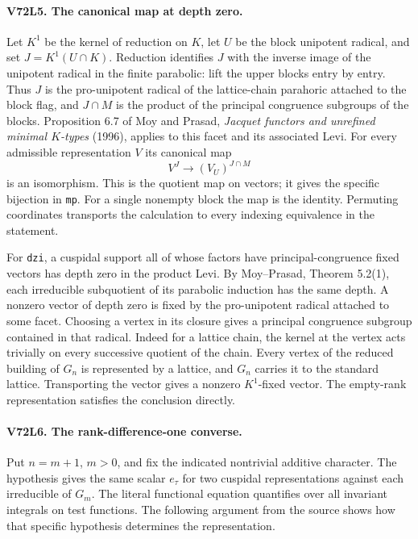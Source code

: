 \paragraph{V72L5. The canonical map at depth zero.}
Let $K^1$ be the kernel of reduction on $K$, let $U$ be the block
unipotent radical, and set $J=K^1(U\cap K)$. Reduction identifies
$J$ with the inverse image of the unipotent radical in the finite
parabolic: lift the upper blocks entry by entry. Thus $J$ is the
pro-unipotent radical of the lattice-chain parahoric attached to
the block flag, and $J\cap M$ is the product of the principal
congruence subgroups of the blocks. Proposition 6.7 of Moy and
Prasad, \emph{Jacquet functors and unrefined minimal $K$-types}
(1996), applies to this facet and its associated Levi. For every
admissible representation $V$ its canonical map
\[
                  V^J\longrightarrow(V_U)^{J\cap M}
\]
is an isomorphism. This is the quotient map on vectors; it gives
the specific bijection in \texttt{mp}. For a single nonempty block
the map is the identity. Permuting coordinates transports the
calculation to every indexing equivalence in the statement.

For \texttt{dzi}, a cuspidal support all of whose factors have
principal-congruence fixed vectors has depth zero in the product
Levi. By Moy--Prasad, Theorem 5.2(1), each irreducible subquotient
of its parabolic induction has the same depth. A nonzero vector of
depth zero is fixed by the pro-unipotent radical attached to some
facet. Choosing a vertex in its closure gives a principal congruence
subgroup contained in that radical. Indeed for a lattice chain,
the kernel at the vertex acts trivially on every successive quotient
of the chain. Every vertex of the reduced building of $G_n$ is
represented by a lattice, and $G_n$ carries it to the standard
lattice. Transporting the vector gives a nonzero $K^1$-fixed vector.
The empty-rank representation satisfies the conclusion directly.

\paragraph{V72L6. The rank-difference-one converse.}
Put $n=m+1$, $m>0$, and fix the indicated nontrivial additive
character. The hypothesis gives the same scalar $e_\tau$ for two
cuspidal representations against each irreducible of $G_m$. The
literal functional equation quantifies over all invariant integrals
on test functions. The following argument from the source shows
how that specific hypothesis determines the representation.

